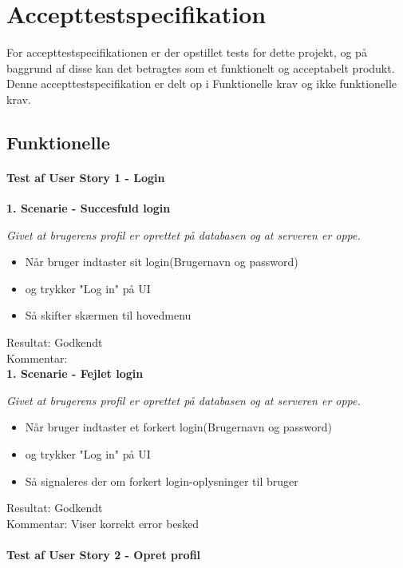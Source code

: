 \section{Accepttestspecifikation}
For accepttestspecifikationen er der opstillet tests for dette projekt, og på baggrund af disse kan det betragtes som et funktionelt og acceptabelt produkt. Denne accepttestspecifikation er delt op i Funktionelle krav og ikke funktionelle krav.

\subsection{Funktionelle}
\paragraph{Test af User Story 1 - Login}

\textbf{1. Scenarie - Succesfuld login}

\textit{Givet at brugerens profil er oprettet på databasen og at serveren er oppe.}

\begin{itemize}
  \item Når bruger indtaster sit login(Brugernavn og password)
  \item og trykker "Log in" på UI
  \item Så skifter skærmen til hovedmenu
\end{itemize}

Resultat: Godkendt\\
Kommentar:\\

\textbf{1. Scenarie - Fejlet login}

\textit{Givet at brugerens profil er oprettet på databasen og at serveren er oppe.}

\begin{itemize}
  \item Når bruger indtaster et forkert login(Brugernavn og password)
  \item og trykker "Log in" på UI
  \item Så signaleres der om forkert login-oplysninger til bruger
\end{itemize}

Resultat: Godkendt\\
Kommentar: Viser korrekt error besked\\

\paragraph{Test af User Story 2 - Opret profil}

